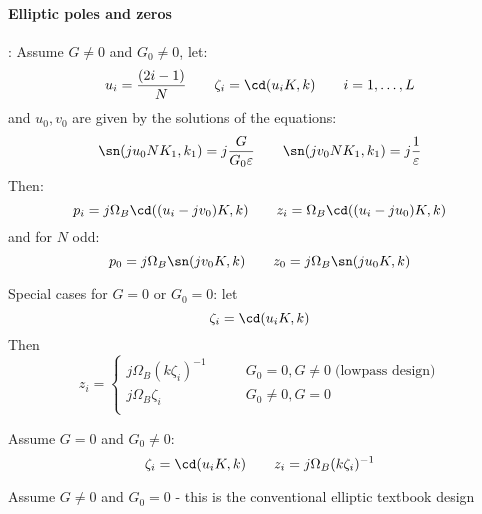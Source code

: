 \paragraph{Elliptic poles and zeros}:
Assume $G \neq 0$ and $G_0 \neq 0$, let:
\begin{equation}
 u_i = \frac{(2i - 1) }{N}\qquad \zeta_i = \cd(u_i K, k) \qquad i = 1, \ldots, L 
\end{equation}
and $u_0, v_0$ are given by the solutions of the equations:
\begin{equation}
 \sn(j u_0 N K_1, k_1) = j \frac{G}{G_0 \varepsilon} \qquad 
 \sn(j v_0 N K_1, k_1) = j \frac{1}{\varepsilon}
\end{equation}
Then:
\begin{equation}
 p_i = j \Omega_B \cd((u_i - j v_0)K, k) \qquad z_i = \Omega_B \cd((u_i - j u_0)K, k)
\end{equation}
and for $N$ odd:
\begin{equation}
 p_0 = j \Omega_B \sn(j v_0 K, k) \qquad z_0 = j \Omega_B \sn(j u_0 K, k)
\end{equation}

Special cases for $G = 0$ or $G_0 = 0$: let
\begin{equation}
 \zeta_i = \cd(u_i K, k)
\end{equation}
Then
\begin{equation}
 z_i =
 \begin{cases}
 j \Omega_B (k \zeta_i)^{-1} \qquad & G_0 = 0,    G \neq 0 \; \text{(lowpass design)} \\
 j \Omega_B \zeta_i          \qquad & G_0 \neq 0, G = 0 \\
 \end{cases}
\end{equation}


Assume $G = 0$ and $G_0 \neq 0$:
\begin{equation}
 \zeta_i = \cd(u_i K, k) \qquad z_i = j \Omega_B (k \zeta_i)^{-1}
\end{equation}


Assume $G \neq 0$ and $G_0 = 0$ - this is the conventional elliptic textbook design















